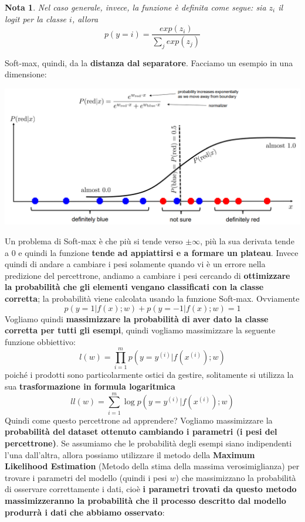 \documentclass[12pt]{article}
\newtheorem{Nota}{Nota}[subsection]
\begin{document}
\begin{Nota}
    Nel caso generale, invece, la funzione è definita come segue: sia $z_i$ il logit per la classe $i$, allora
    $$p(y = i) = \frac{exp(z_i)}{\sum_j exp(z_j)}$$
\end{Nota}
Soft-max, quindi, da la \textbf{distanza dal separatore}. Facciamo un esempio in una dimensione:
\begin{center}
    \includegraphics[width =1\linewidth]{Images/113.PNG}
\end{center}
Un problema di Soft-max è che più si tende verso $\pm \infty$, più la sua derivata tende a 0 e quindi la funzione \textbf{tende ad appiattirsi e a formare un plateau}.
Invece quindi di andare a cambiare i pesi solamente quando vi è un errore nella predizione del percettrone, andiamo a cambiare i pesi cercando di \textbf{ottimizzare la probabilità che gli elementi vengano classificati con la classe corretta}; la probabilità viene calcolata usando la funzione Soft-max.
Ovviamente
$$p(y = 1|f(x); w) + p(y = -1|f(x); w) = 1$$
Vogliamo quindi \textbf{massimizzare la probabilità di aver dato la classe corretta per tutti gli esempi}, quindi vogliamo massimizzare la seguente funzione obbiettivo:
$$l(w) = \prod_{i = 1}^m p(y = y^{(i)}|f(x^{(i)}); w)$$
poiché i prodotti sono particolarmente ostici da gestire, solitamente si utilizza la sua \textbf{trasformazione in formula logaritmica}
$$ll(w) = \sum_{i=1}^m \log p(y = y^{(i)}|f(x^{(i)}); w)$$
Quindi come questo percettrone ad apprendere?
Vogliamo massimizzare la \textbf{probabilità del dataset ottenuto cambiando i parametri (i pesi del percettrone)}.
Se assumiamo che le probabilità degli esempi siano indipendenti l'una dall'altra, allora possiamo utilizzare il metodo della \textbf{Maximum Likelihood Estimation} (Metodo della stima della massima verosimiglianza) per trovare i parametri del modello (quindi i pesi $w$) che massimizzano la probabilità di osservare correttamente i dati, cioè \textbf{i parametri trovati da questo metodo massimizzeranno la probabilità che il processo descritto dal modello produrrà i dati che abbiamo osservato}:
\end{document}
